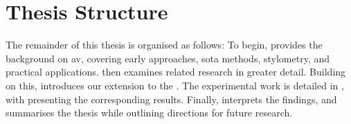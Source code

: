 \section{Thesis Structure}
\label{sec:thesis_structure}

The remainder of this thesis is organised as follows: 
To begin,  provides the background on \ac{av}, covering early approaches, \acl{sota} methods, stylometry, and practical applications.
 then examines related research in greater detail.
Building on this,  introduces our extension to the \impAppr{}.
The experimental work is detailed in , with  presenting the corresponding results.
Finally,  interprets the findings, and  summarises the thesis while outlining directions for future research.
